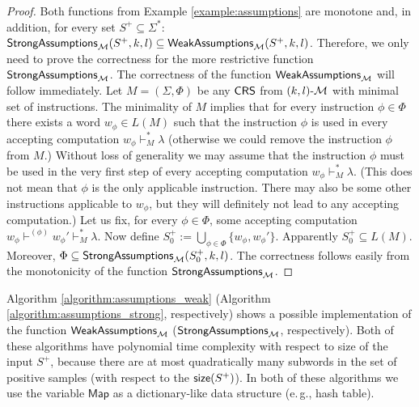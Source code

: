 \begin{proof}
Both functions from Example \ref{example:assumptions} are monotone and, in addition, for every set $S^+ \subseteq \Sigma^*$: $\mathsf{StrongAssumptions}_{\textup{\sf $\mathcal{M}$}}(S^+,k,l) \subseteq \mathsf{WeakAssumptions}_{\textup{\sf $\mathcal{M}$}}(S^+,k,l)$. Therefore, we only need to prove the correctness for the more restrictive function $\mathsf{StrongAssumptions}_{\textup{\sf $\mathcal{M}$}}$. The correctness of the function $\mathsf{WeakAssumptions}_{\textup{\sf $\mathcal{M}$}}$ will follow immediately. Let $M = (\Sigma, \Phi)$ be any $\textup{\sf CRS\/}$ from $\textup{\sf $(k,l)$-\textup{\sf $\mathcal{M}$}}$ with minimal set of instructions. The minimality of $M$ implies that for every instruction $\phi \in \Phi$ there exists a word $w_{\phi} \in L(M)$ such that the instruction $\phi$ is used in every accepting computation $w_{\phi} \vdash_M^* \lambda$ (otherwise we could remove the instruction $\phi$ from $M$.) Without loss of generality we may assume that the instruction $\phi$ must be used in the very first step of every accepting computation $w_{\phi} \vdash_M^* \lambda$. (This does not mean that $\phi$ is the only applicable instruction. There may also be some other instructions applicable to $w_{\phi}$, but they will definitely not lead to any accepting computation.) Let us fix, for every $\phi \in \Phi$, some accepting computation $w_{\phi} \vdash^{(\phi)} w_{\phi}' \vdash_M^* \lambda$. Now define $S_0^+ := \bigcup_{\phi \in \Phi} \{ w_{\phi}, w_{\phi}' \}$. Apparently $S_0^+ \subseteq L(M)$. Moreover, $\Phi \subseteq \mathsf{StrongAssumptions}_{\textup{\sf $\mathcal{M}$}}(S_0^+, k, l)$. The correctness follows easily from the monotonicity of the function $\mathsf{StrongAssumptions}_{\textup{\sf $\mathcal{M}$}}$.
\end{proof}

Algorithm \ref{algorithm:assumptions_weak} (Algorithm \ref{algorithm:assumptions_strong}, respectively) shows a possible implementation of the function $\mathsf{WeakAssumptions}_{\textup{\sf $\mathcal{M}$}}$ ($\mathsf{StrongAssumptions}_{\textup{\sf $\mathcal{M}$}}$, respectively). Both of these algorithms have polynomial time complexity with respect to size of the input $S^+$, because there are at most quadratically many subwords in the set of positive samples (with respect to the $\textup{\sf size}(S^+)$). In both of these algorithms we use the variable $\mathsf{Map}$ as a dictionary-like data structure (e.\,g., hash table).

